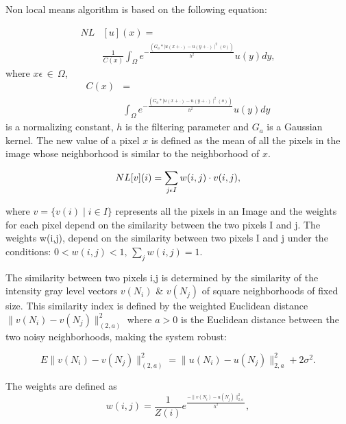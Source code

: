 Non local means algorithm is based on the following equation:

\begin{equation}
	\begin{split}
		NL&[u](x)=\\
        &\frac{1}{C(x)}\int_{\Omega} e^{-\frac{(G_a*\mid u(x+.)-u(y+.)\mid ^2(o))}{h^2}}u(y)dy,
	\end{split}
\end{equation}
where $x \epsilon\, \in\,  \Omega$,
\begin{equation}
	\begin{split}
	    C(x)&= \\
        &\int_{\Omega} e^{-\frac{(G_a*\mid u(x+.)-u(y+.)\mid ^2(o))}{h^2}}u(y)dy
    \end{split}
\end{equation}
is a normalizing constant, $h$ is the filtering parameter and $G_a$ is a Gaussian kernel. The new value of a pixel $x$ is defined as the mean of all the pixels in the image whose neighborhood is similar to the neighborhood of $x$.

\begin{equation}
	NL[v](i)=\sum_{j\space\epsilon\space I}{w(i,j)\cdot v(i,j)},
\end{equation}

where $v= \{v(i)  \mid  i \in I \}$ represents all the pixels in an Image and the weights for each pixel depend on the similarity between the two pixels I and j. The weights {w(i,j)}, depend on the similarity between two pixels I and j under the conditions: $0 < w(i,j)< 1,\,\sum_{j}{w(i,j)}=1$.

The similarity between two pixels i,j is determined by the similarity of the intensity gray level vectors $v(N_i)$ \& $v(N_j)$ of square neighborhoods of fixed size. This similarity index is defined by the weighted Euclidean distance $\parallel v(N_i )-v(N_j ) \parallel _{(2,a)}^2$  where $a > 0$ is the Euclidean distance between the two noisy neighborhoods, making the system robust:

\begin{equation}
	E\parallel v(N_i )-v(N_j )\parallel_{(2,a)}^2=
    \parallel u(N_i )-u(N_j ) \parallel _{2,a}^2+2 \sigma^2.
\end{equation}

The weights are defined as 
\begin{equation}
w(i,j)=\frac{1}{Z(i)} e^\frac{-\parallel v(N_i)-u(N_j) \parallel _{2,a}^2 }{h^2},
\end{equation}

